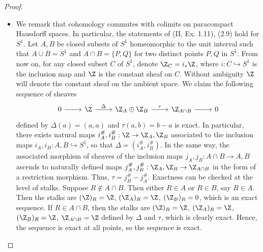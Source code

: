 \documentclass[a4paper]{article}
\begin{document}
\begin{enumerate} [label=\textbf{\arabic*.}, leftmargin=0em]
          \begin{proof} $ $ \vspace{0pt}
              \begin{itemize} [leftmargin=0cm]
                  \item[(a)] We remark that cohomology commutes with colimits on paracompact Hausdorff spaces. In particular, the statements of (II, Ex. 1.11), (2.9) hold for $S^1$. Let $A, B$ be closed subsets of $S^1$ homeomorphic to the unit interval such that $A \cup B = S^1$ and $A \cap B = \{ P, Q \}$ for two distinct points $P, Q$ in $S^1$. From now on, for any closed subset $C$ of $S^1$, denote $\Z_C = i_* \Z$, where $i : C \hookrightarrow S^1$ is the inclusion map and $\Z$ is the constant sheaf on $C$. Without ambiguity $\Z$ will denote the constant sheaf on the ambient space. We claim the following sequence of sheaves
                        \[\begin{tikzcd}
                                0 \arrow[r] & \Z \arrow[r, "\Delta"] & \Z_A \oplus \Z_B \arrow[r, "\tau"] & \Z_{A \cap B} \arrow[r] & 0
                            \end{tikzcd}\]
                        defined by $\Delta(a) = (a, a)$ and $\tau(a, b) = b - a$ is exact. In particular, there exists natural maps $i^\#_A, i^\#_B : \Z \to \Z_A, \Z_B$ associated to the inclusion maps $i_A, i_B : A, B \hookrightarrow S^1$, so that $\Delta = (i_A^\#, i_B^\#)$. In the same way, the associated morphism of sheaves of the inclusion maps $j_A, j_B : A \cap B \to A, B$ ascends to naturally defined maps $j_A^\#, j_B^\# : \Z_A, \Z_B \to \Z_{A \cap B}$ in the form of a restriction morphism. Thus, $\tau = j_B^\# - j_A^\#$. Exactness can be checked at the level of stalks. Suppose $R \notin A \cap B$. Then either $R \in A$ or $R \in B$, say $R \in A$. Then the stalks are $(\Z)_R = \Z$, $(\Z_A)_R = \Z$, $(\Z_B)_R = 0$, which is an exact sequence. If $R \in A \cap B$, then the stalks are $(\Z)_R = \Z$, $(\Z_A)_R = \Z$, $(\Z_B)_R = \Z$, $\Z_{A \cap B} = \Z$ defined by $\Delta$ and $\tau$, which is clearly exact. Hence, the sequence is exact at all points, so the sequence is exact.


\end{itemize}
\end{proof}
\end{enumerate}
\end{document}
